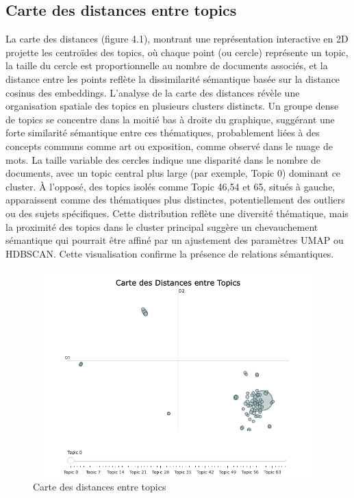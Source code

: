 \documentclass[mstat,12pt]{unswthesis}
\begin{document}
\subsection{Carte des distances entre topics }


La carte des distances (figure 4.1), montrant une représentation interactive en 2D projette les 
centroïdes des topics, où chaque point (ou cercle) représente un topic, la taille du cercle est 
proportionnelle au nombre de documents associés, et la distance entre les points reflète la 
dissimilarité sémantique basée sur la distance cosinus des embeddings. 
L’analyse de la carte des distances révèle une organisation spatiale des topics en plusieurs 
clusters distincts. Un groupe dense de topics se concentre dans la moitié bas à droite du 
graphique, suggérant une forte similarité sémantique entre ces thématiques, probablement 
liées à des concepts communs comme art ou exposition, comme observé dans le nuage de 
mots. La taille variable des cercles indique une disparité dans le nombre de documents, avec 
un topic central plus large (par exemple, Topic 0) dominant ce cluster. À l’opposé, des topics 
isolés comme Topic  46,54 et 65, situés à gauche, apparaissent comme des thématiques plus 
distinctes, potentiellement des outliers ou des sujets spécifiques. Cette distribution reflète une 
diversité thématique, mais la proximité des topics dans le cluster principal suggère un 
chevauchement sémantique qui pourrait être affiné par un ajustement des paramètres UMAP 
ou HDBSCAN. Cette visualisation confirme la présence de relations sémantiques.  


\begin{figure}[H]
    \centering
    \includegraphics[width=15cm,height=8cm]{CarteDistance.png}
    \caption{Carte des distances entre topics}
    \label{fig:enquete}
\end{figure}
\end{document}
